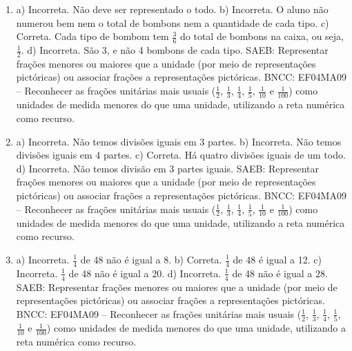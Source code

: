 \begin{enumerate}
\item
a) Incorreta. Não deve ser representado o todo.
b) Incorreta. O aluno não numerou bem nem o total de bombons nem a quantidade de cada tipo.
c) Correta. Cada tipo de bombom tem $\frac{3}{6}$ do total de bombons na caixa, ou seja, $\frac{1}{2}$.
d) Incorreta. São 3, e não 4 bombons de cada tipo.
SAEB: Representar frações menores ou maiores que a unidade (por meio de representações
pictóricas) ou associar frações a representações pictóricas.
BNCC: EF04MA09 -- Reconhecer as frações unitárias mais usuais ($\frac{1}{2}$, $\frac{1}{3}$, $\frac{1}{4}$, $\frac{1}{5}$, $\frac{1}{10}$ e $\frac{1}{100}$) como
unidades de medida menores do que uma unidade, utilizando a reta numérica como recurso.

\item
a)  Incorreta. Não temos divisões iguais em 3 partes.
b)  Incorreta. Não temos divisões iguais em 4 partes.
c)  Correta. Há quatro divisões iguais de um todo.
d)  Incorreta. Não temos divisão em 3 partes iguais.
SAEB: Representar frações menores ou maiores que a unidade (por meio de representações
pictóricas) ou associar frações a representações pictóricas.
BNCC: EF04MA09 -- Reconhecer as frações unitárias mais usuais ($\frac{1}{2}$, $\frac{1}{3}$, $\frac{1}{4}$, $\frac{1}{5}$, $\frac{1}{10}$ e $\frac{1}{100}$) como
unidades de medida menores do que uma unidade, utilizando a reta numérica como recurso.

\item
a)  Incorreta. $\frac{1}{4}$ de 48 não é igual a 8.
b)  Correta. $\frac{1}{4}$ de 48 é igual a 12.
c)  Incorreta. $\frac{1}{4}$ de 48 não é igual a 20.
d)  Incorreta. $\frac{1}{4}$ de 48 não é igual a 28.
SAEB: Representar frações menores ou maiores que a unidade (por meio de representações
pictóricas) ou associar frações a representações pictóricas.
BNCC: EF04MA09 -- Reconhecer as frações unitárias mais usuais ($\frac{1}{2}$, $\frac{1}{3}$, $\frac{1}{4}$, $\frac{1}{5}$, $\frac{1}{10}$ e $\frac{1}{100}$) como
unidades de medida menores do que uma unidade, utilizando a reta numérica como recurso.
\end{enumerate}


